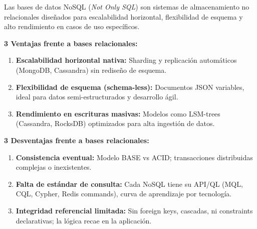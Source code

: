 \item
Las bases de datos NoSQL (\textit{Not Only SQL}) son sistemas de almacenamiento no relacionales diseñados para escalabilidad horizontal, flexibilidad de esquema y alto rendimiento en casos de uso específicos.

\textbf{3 Ventajas frente a bases relacionales:}
\begin{enumerate}
	\item \textbf{Escalabilidad horizontal nativa:} Sharding y replicación automáticos (MongoDB, Cassandra) sin rediseño de esquema.
	\item \textbf{Flexibilidad de esquema (schema-less):} Documentos JSON variables, ideal para datos semi-estructurados y desarrollo ágil.
	\item \textbf{Rendimiento en escrituras masivas:} Modelos como LSM-trees (Cassandra, RocksDB) optimizados para alta ingestión de datos.
\end{enumerate}

\textbf{3 Desventajas frente a bases relacionales:}
\begin{enumerate}
	\item \textbf{Consistencia eventual:} Modelo BASE vs ACID; transacciones distribuidas complejas o inexistentes.
	\item \textbf{Falta de estándar de consulta:} Cada NoSQL tiene su API/QL (MQL, CQL, Cypher, Redis commands), curva de aprendizaje por tecnología.
	\item \textbf{Integridad referencial limitada:} Sin foreign keys, cascadas, ni constraints declarativas; la lógica recae en la aplicación.
\end{enumerate}
